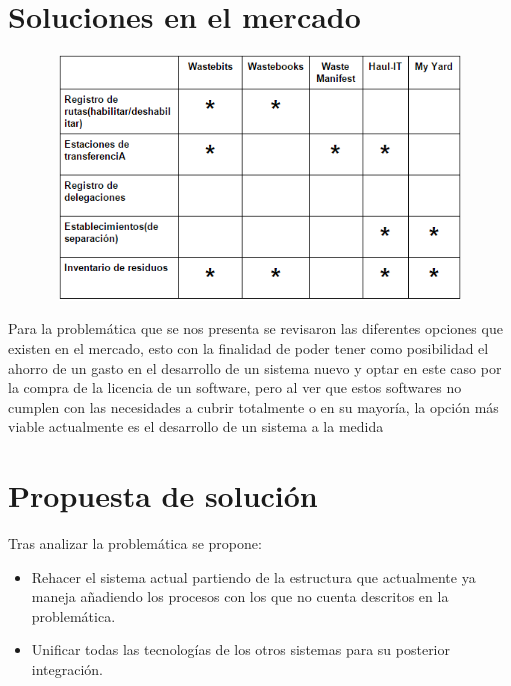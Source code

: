 \section{Soluciones en el mercado}
\begin{figure}[h!]
	\includegraphics[width=13cm, height=6.5cm]{tabla.PNG}
\end{figure}

Para la problemática que se nos presenta se revisaron las diferentes opciones que existen en el mercado, esto con la finalidad  de poder tener como  posibilidad  el ahorro de un   gasto en el desarrollo de un sistema nuevo  y optar  en este caso por  la compra de la licencia de un software, pero al ver que estos softwares no cumplen con las necesidades a cubrir totalmente o en su mayoría, la opción más viable actualmente es el desarrollo de un sistema a la medida 

\section{Propuesta de solución}
Tras analizar la problemática se propone:
\begin{itemize}
	\item Rehacer el sistema actual partiendo de la estructura que actualmente ya maneja añadiendo los procesos con los que no cuenta descritos en la problemática. 
	\item Unificar todas las tecnologías de los otros sistemas para su posterior integración.
\end{itemize}



